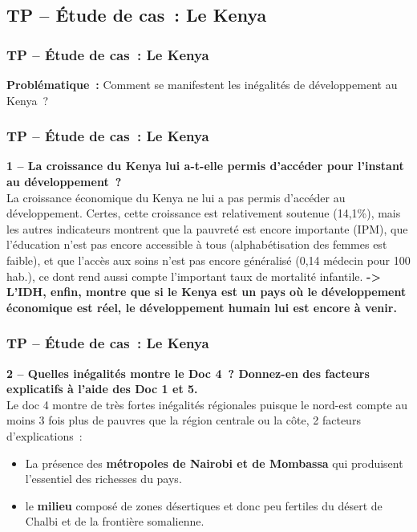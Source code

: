 \documentclass[C]{beamer}
\begin{document}
	\subsection*{TP -- \'Etude de cas~: Le Kenya}
	\begin{frame}
	\frametitle{TP -- \'Etude de cas~: Le Kenya}
	\begin{center}
	\textbf{Problématique~:} Comment se manifestent les inégalités de développement au Kenya~?
	\end{center}
	\end{frame}
	
	\begin{frame}
	\frametitle{TP -- \'Etude de cas~: Le Kenya}
	\textbf{1 -- La croissance du Kenya lui a-t-elle permis d'accéder pour l'instant au développement~?}\\
\pause
La croissance économique du Kenya ne lui a pas permis d'accéder au développement. Certes, cette croissance est relativement soutenue (14,1\%), mais les autres indicateurs montrent que la pauvreté est encore importante (IPM), que l'éducation n'est pas encore accessible à tous (alphabétisation des femmes est faible), et que l'accès aux soins n'est pas encore généralisé (0,14 médecin pour 100 hab.), ce dont rend aussi compte l'important taux de mortalité infantile.
\textbf{-> L'IDH, enfin, montre que si le Kenya est un pays où le développement économique est réel, le développement humain lui est encore à venir.}
	\end{frame}
	
	\begin{frame}
	\frametitle{ TP -- \'Etude de cas~: Le Kenya}
	\textbf{2 -- Quelles inégalités montre le Doc 4~? Donnez-en des facteurs explicatifs à l'aide des Doc 1 et 5.}\\
\pause
Le doc 4 montre de très fortes inégalités régionales puisque le nord-est compte au moins 3 fois plus de pauvres que la région centrale ou la côte, 2 facteurs d'explications~:
	\begin{itemize}
	\item La présence des \textbf{métropoles de Nairobi et de Mombassa} qui produisent l'essentiel des richesses du pays.\\
\pause
	\item le \textbf{milieu} composé de zones désertiques et donc peu fertiles du désert de Chalbi et de la frontière somalienne.
	\end{itemize}
	\end{frame}
	
\end{document}
